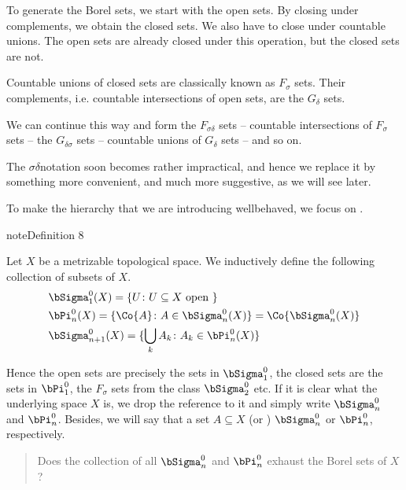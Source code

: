 \documentclass[letterpaper,10pt,english]{jupyterBook}
\begin{document}
\sphinxAtStartPar
To generate the Borel sets, we start with the open sets. By closing under complements, we obtain the closed sets. We also have to close under countable unions. The open sets are already closed under this operation, but the closed sets are not.

\sphinxAtStartPar
Countable unions of closed sets are classically known as \(F_\sigma\) sets. Their complements, i.e. countable intersections of open sets, are the \(G_\delta\) sets.

\sphinxAtStartPar
We can continue this way and form the \(F_{\sigma\delta}\) sets – countable intersections of \(F_\sigma\) sets – the \(G_{\delta\sigma}\) sets – countable unions of \(G_\delta\) sets – and so on.

\sphinxAtStartPar
The \(\sigma\delta\)\sphinxhyphen{}notation soon becomes rather impractical, and hence we replace it by something more convenient, and much more suggestive, as we will see later.

\sphinxAtStartPar
To make the hierarchy that we are introducing well\sphinxhyphen{}behaved, we focus on .
\label{Borel:def-Borel-finite}
\begin{sphinxadmonition}{note}{Definition 8}



\sphinxAtStartPar
Let \(X\) be a metrizable topological space. We inductively define the following collection of subsets of \(X\).
\begin{align*}
    & \bSigma^0_1(X) = \{ U \colon U\subseteq X \text{ open } \} \\
    & \bPi^0_n(X) = \{ \Co{A} \colon A \in \bSigma^0_n(X) \} = \Co{\bSigma^0_n(X)} \\
    & \bSigma^0_{n+1}(X) = \{ \bigcup_k A_k \colon A_k \in \bPi^0_n(X) \} 
\end{align*}\end{sphinxadmonition}

\sphinxAtStartPar
Hence the open sets are precisely the sets in \(\bSigma^0_1\), the closed sets are the sets in \(\bPi^0_1\), the \(F_\sigma\) sets from the class \(\bSigma^0_2\) etc. If it is clear what the underlying space \(X\) is, we drop the reference to it and simply write \(\bSigma^0_n\) and \(\bPi^0_n\). Besides, we will say that a set \(A \subseteq X\)  (or ) \(\bSigma^0_n\) or \(\bPi^0_n\), respectively.
\begin{quote}

\sphinxAtStartPar
{} Does the collection of all \(\bSigma^0_n\) and \(\bPi^0_n\) exhaust the Borel sets of \(X\)?
\end{quote}
\end{document}
